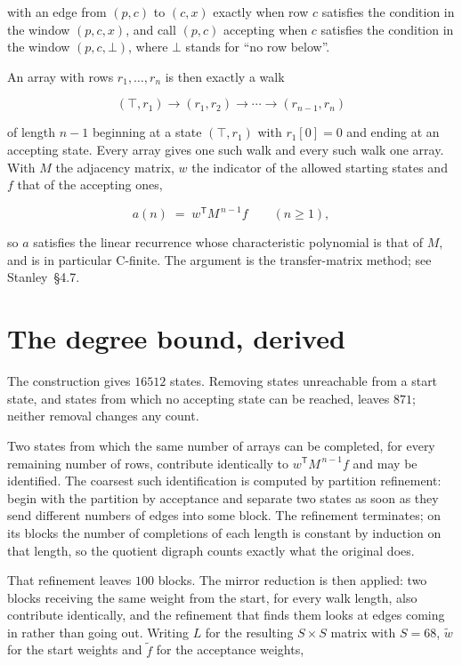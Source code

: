 \documentclass[11pt]{article}
\theoremstyle{definition}
\begin{document}
with an edge from $(p,c)$ to $(c,x)$ exactly when row $c$ satisfies the condition in the window $(p,c,x)$, and call $(p,c)$ accepting when $c$ satisfies the condition in the window $(p,c,\bot)$, where $\bot$ stands for ``no row below''.

An array with rows $r_1,\dots,r_n$ is then exactly a walk

\[(\top,r_1) \to (r_1,r_2) \to \cdots \to (r_{n-1},r_n)\]

of length $n-1$ beginning at a state $(\top,r_1)$ with $r_1[0]=0$ and ending at an accepting state. Every array gives one such walk and every such walk one array. With $M$ the adjacency matrix, $w$ the indicator of the allowed starting states and $f$ that of the accepting ones,

\[a(n) \;=\; w^{\mathsf T} M^{\,n-1} f \qquad (n \ge 1),\]

so $a$ satisfies the linear recurrence whose characteristic polynomial is that of $M$, and is in particular C-finite. The argument is the transfer-matrix method; see Stanley~\S4.7.

\section{The degree bound, derived}

The construction gives $16512$ states. Removing states unreachable from a start state, and states from which no accepting state can be reached, leaves $871$; neither removal changes any count.

Two states from which the same number of arrays can be completed, for every remaining number of rows, contribute identically to $w^{\mathsf T}M^{\,n-1}f$ and may be identified. The coarsest such identification is computed by partition refinement: begin with the partition by acceptance and separate two states as soon as they send different numbers of edges into some block. The refinement terminates; on its blocks the number of completions of each length is constant by induction on that length, so the quotient digraph counts exactly what the original does.

That refinement leaves $100$ blocks. The mirror reduction is then applied: two blocks receiving the same weight from the start, for every walk length, also contribute identically, and the refinement that finds them looks at edges coming in rather than going out. Writing $L$ for the resulting $S \times S$ matrix with $S = 68$, $\tilde w$ for the start weights and $\tilde f$ for the acceptance weights,
\end{document}
